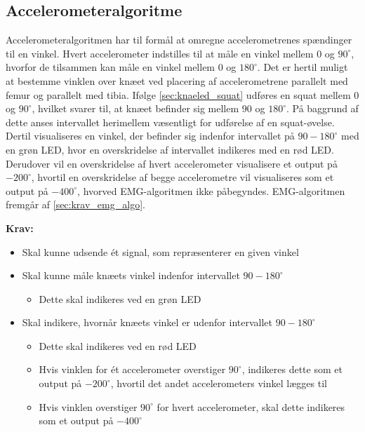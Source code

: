 \subsection{Accelerometeralgoritme}
Accelerometeralgoritmen har til formål at omregne accelerometrenes spændinger til en vinkel. 
Hvert accelerometer indstilles til at måle en vinkel mellem 0 og $90^{\circ}$, hvorfor de tilsammen kan måle en vinkel mellem 0 og $180^{\circ}$. 
Det er hertil muligt at bestemme vinklen over knæet ved placering af accelerometrene parallelt med femur og parallelt med tibia. 
Ifølge \autoref{sec:knaeled_squat} udføres en squat mellem $0$ og $90^{\circ}$, hvilket svarer til, at knæet befinder sig mellem $90$ og $180^{\circ}$. 
På baggrund af dette anses intervallet herimellem væsentligt for udførelse af en squat-øvelse. 
Dertil visualiseres en vinkel, der befinder sig indenfor intervallet på $90-180^{\circ}$ med en grøn LED, hvor en overskridelse af intervallet indikeres med en rød LED. 
Derudover vil en overskridelse af hvert accelerometer visualisere et output på $-200^{\circ}$, hvortil en overskridelse af begge accelerometre vil visualiseres som et output på $-400^{\circ}$, hvorved EMG-algoritmen ikke påbegyndes. EMG-algoritmen fremgår af \autoref{sec:krav_emg_algo}.
 
\vspace{3mm}
\textbf{Krav:}
\begin{itemize}
\item Skal kunne udsende ét signal, som repræsenterer en given vinkel
\item Skal kunne måle knæets vinkel indenfor intervallet $90-180^{\circ}$
\begin{itemize}
\item Dette skal indikeres ved en grøn LED
\end{itemize}
\item Skal indikere, hvornår knæets vinkel er udenfor intervallet $90-180^{\circ}$
\begin{itemize}
\item Dette skal indikeres ved en rød LED
\item Hvis vinklen for ét accelerometer overstiger $90^{\circ}$, indikeres dette som et output på $-200^{\circ}$, hvortil det andet accelerometers vinkel lægges til
\item Hvis vinklen overstiger $90^{\circ}$ for hvert accelerometer, skal dette indikeres som et output på $-400^{\circ}$
\end{itemize}
\end{itemize}